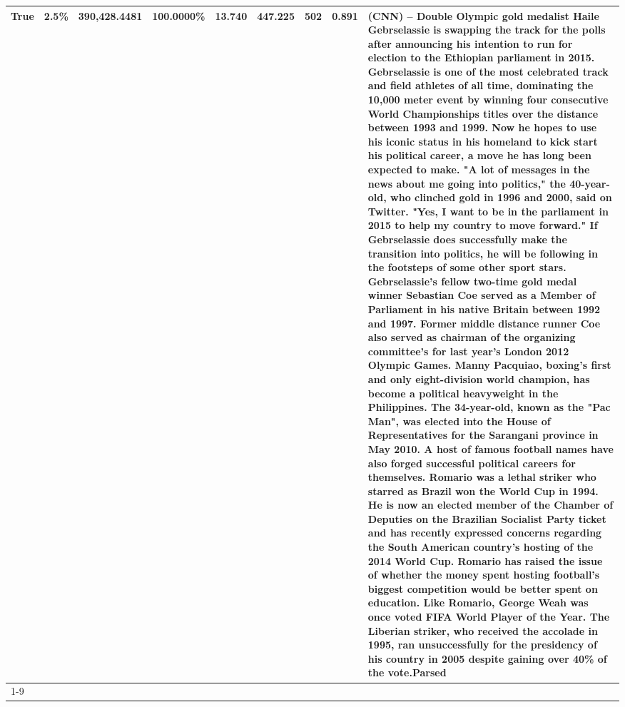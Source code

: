 \begin{table}[H]
{\begin{tabular}{lllrlllll}
True & 2.5\% & 390,428.4481 & \bfseries \color{red} 100.0000\% & 13.740 & 447.225 & 502 & 0.891 & (CNN) -- Double Olympic gold medalist Haile Gebrselassie is swapping the track for the polls after announcing his intention to run for election to the Ethiopian parliament in 2015. Gebrselassie is one of the most celebrated track and field athletes of all time, dominating the 10,000 meter event by winning four consecutive World Championships titles over the distance between 1993 and 1999. Now he hopes to use his iconic status in his homeland to kick start his political career, a move he has long been expected to make. "A lot of messages in the news about me going into politics," the 40-year-old, who clinched gold in 1996 and 2000, said on Twitter. "Yes, I want to be in the parliament in 2015 to help my country to move forward." If Gebrselassie does successfully make the transition into politics, he will be following in the footsteps of some other sport stars. Gebrselassie's fellow two-time gold medal winner Sebastian Coe served as a Member of Parliament in his native Britain between 1992 and 1997. Former middle distance runner Coe also served as chairman of the organizing committee's for last year's London 2012 Olympic Games. Manny Pacquiao, boxing's first and only eight-division world champion, has become a political heavyweight in the Philippines. The 34-year-old, known as the "Pac Man", was elected into the House of Representatives for the Sarangani province in May 2010. A host of famous football names have also forged successful political careers for themselves. Romario was a lethal striker who starred as Brazil won the World Cup in 1994. He is now an elected member of the Chamber of Deputies on the Brazilian Socialist Party ticket and has recently expressed concerns regarding the South American country's hosting of the 2014 World Cup. Romario has raised the issue of whether the money spent hosting football's biggest competition would be better spent on education. Like Romario, George Weah was once voted FIFA World Player of the Year. The Liberian striker, who received the accolade in 1995, ran unsuccessfully for the presidency of his country in 2005 despite gaining over 40\% of the vote.Parsed \\
\cline{1-9}

\end{tabular}}
\end{table}
